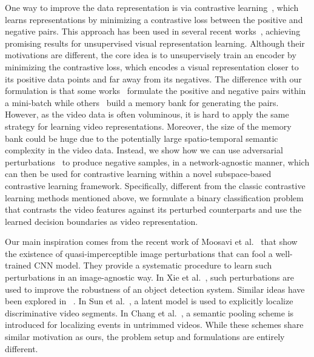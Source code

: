 \documentclass[runningheads]{llncs}
\begin{document}
One way to improve the data representation is via contrastive learning~\cite{hadsell2006dimensionality}, which learns representations by minimizing a contrastive loss between the positive and negative pairs. This approach has been used in several recent works~\cite{bachman2019learning,henaff2019data,hjelm2018learning,oord2018representation,tian2019contrastive,wu2018unsupervised,zhuang2019local,he2019momentum,chen2020simple}, achieving promising results for unsupervised visual representation learning. Although their motivations are different, the core idea is to unsupervisely train an encoder by minimizing the contrastive loss, which encodes a visual representation closer to its positive data points and far away from its negatives. The difference with our formulation is that some works~\cite{bachman2019learning,henaff2019data,hjelm2018learning,oord2018representation,tian2019contrastive,zhuang2019local,chen2020simple} formulate the positive and negative pairs within a mini-batch while others~\cite{he2019momentum,wu2018unsupervised} build a memory bank for generating the pairs. However, as the video data is often voluminous, it is hard to apply the same strategy for learning video representations. Moreover, the size of the memory bank could be huge due to the potentially large spatio-temporal semantic complexity in the video data. Instead, we show how we can use  adversarial perturbations~\cite{moosavi2017universal} to produce negative samples, in a network-agnostic manner, which can then be used for contrastive learning within a novel subspace-based contrastive learning framework. Specifically, different from the classic contrastive learning methods mentioned above, we formulate a binary classification problem that contrasts the video features against its perturbed counterparts and use the learned decision boundaries as video representation.


Our main inspiration comes from the recent work of Moosavi et al.~\cite{moosavi2017universal} that show the existence of quasi-imperceptible image perturbations that can fool a well-trained CNN model. They provide a systematic procedure to learn such perturbations in an image-agnostic way. In Xie et al.~\cite{xie2017adversarial}, such perturbations are used to improve the robustness of an object detection system. Similar ideas have been explored in ~\cite{lu2017safetynet,oh2017adversarial,zhang2018deep}. In Sun et al.~\cite{sun2014discover}, a latent model is used to explicitly localize discriminative video segments. In Chang et al.~\cite{chang2017semantic}, a semantic pooling scheme is introduced for localizing events in untrimmed videos. While these schemes share similar motivation as ours, the problem setup and formulations are entirely different. 
\end{document}

